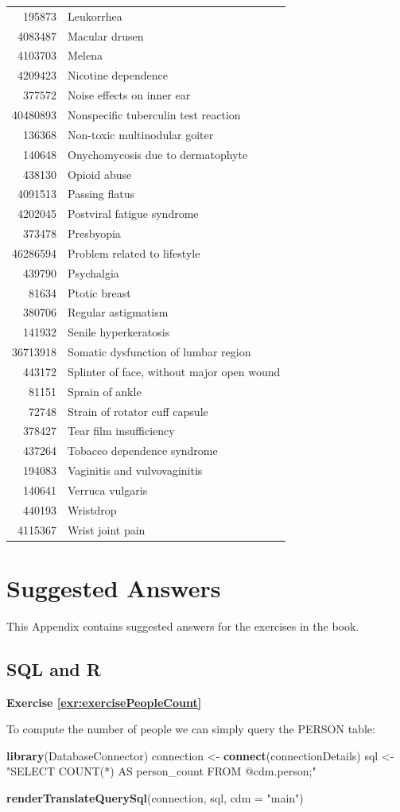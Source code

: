 \documentclass[11pt]{book}
\newenvironment{Shaded}{\begin{snugshade}}{\end{snugshade}}
\newcommand{\DataTypeTok}[1]{\textcolor[rgb]{0.13,0.29,0.53}{#1}}
\newcommand{\KeywordTok}[1]{\textcolor[rgb]{0.13,0.29,0.53}{\textbf{#1}}}
\newcommand{\NormalTok}[1]{#1}
\newcommand{\StringTok}[1]{\textcolor[rgb]{0.31,0.60,0.02}{#1}}
\theoremstyle{definition}
\theoremstyle{definition}
\theoremstyle{definition}
\theoremstyle{remark}
\begin{document}
\begin{longtable}[]{@{}rl@{}}
195873 & Leukorrhea\tabularnewline
4083487 & Macular drusen\tabularnewline
4103703 & Melena\tabularnewline
4209423 & Nicotine dependence\tabularnewline
377572 & Noise effects on inner ear\tabularnewline
40480893 & Nonspecific tuberculin test reaction\tabularnewline
136368 & Non-toxic multinodular goiter\tabularnewline
140648 & Onychomycosis due to dermatophyte\tabularnewline
438130 & Opioid abuse\tabularnewline
4091513 & Passing flatus\tabularnewline
4202045 & Postviral fatigue syndrome\tabularnewline
373478 & Presbyopia\tabularnewline
46286594 & Problem related to lifestyle\tabularnewline
439790 & Psychalgia\tabularnewline
81634 & Ptotic breast\tabularnewline
380706 & Regular astigmatism\tabularnewline
141932 & Senile hyperkeratosis\tabularnewline
36713918 & Somatic dysfunction of lumbar region\tabularnewline
443172 & Splinter of face, without major open wound\tabularnewline
81151 & Sprain of ankle\tabularnewline
72748 & Strain of rotator cuff capsule\tabularnewline
378427 & Tear film insufficiency\tabularnewline
437264 & Tobacco dependence syndrome\tabularnewline
194083 & Vaginitis and vulvovaginitis\tabularnewline
140641 & Verruca vulgaris\tabularnewline
440193 & Wristdrop\tabularnewline
4115367 & Wrist joint pain\tabularnewline
\bottomrule
\end{longtable}

\hypertarget{SuggestedAnswers}{%
\chapter{Suggested Answers}\label{SuggestedAnswers}}

This Appendix contains suggested answers for the exercises in the book.

\hypertarget{SqlAndRanswers}{%
\section{SQL and R}\label{SqlAndRanswers}}

\textbf{Exercise \ref{exr:exercisePeopleCount}}

To compute the number of people we can simply query the PERSON table:

\begin{Shaded}
\begin{Highlighting}[]
\KeywordTok{library}\NormalTok{(DatabaseConnector)}
\NormalTok{connection <-}\StringTok{ }\KeywordTok{connect}\NormalTok{(connectionDetails)}
\NormalTok{sql <-}\StringTok{ "SELECT COUNT(*) AS person_count}
\StringTok{FROM @cdm.person;"}

\KeywordTok{renderTranslateQuerySql}\NormalTok{(connection, sql, }\DataTypeTok{cdm =} \StringTok{"main"}\NormalTok{)}
\end{Highlighting}
\end{Shaded}
\end{document}
